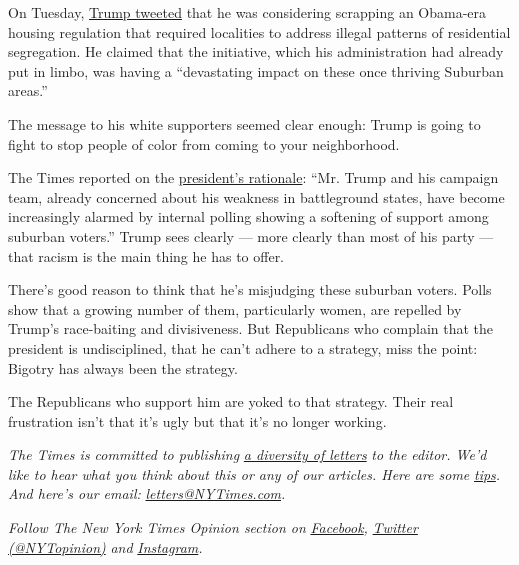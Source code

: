 On Tuesday,
\href{https://twitter.com/realDonaldTrump/status/1278136326647406593?s=20}{Trump
tweeted} that he was considering scrapping an Obama-era housing
regulation that required localities to address illegal patterns of
residential segregation. He claimed that the initiative, which his
administration had already put in limbo, was having a ``devastating
impact on these once thriving Suburban areas.''

The message to his white supporters seemed clear enough: Trump is going
to fight to stop people of color from coming to your neighborhood.

The Times reported on the
\href{https://www.nytimes3xbfgragh.onion/2020/07/01/us/politics/trump-obama-housing-discrimination.html?action=click\&module=Top\%20Stories\&pgtype=Homepage}{president's
rationale}: ``Mr. Trump and his campaign team, already concerned about
his weakness in battleground states, have become increasingly alarmed by
internal polling showing a softening of support among suburban voters.''
Trump sees clearly --- more clearly than most of his party --- that
racism is the main thing he has to offer.

There's good reason to think that he's misjudging these suburban voters.
Polls show that a growing number of them, particularly women, are
repelled by Trump's race-baiting and divisiveness. But Republicans who
complain that the president is undisciplined, that he can't adhere to a
strategy, miss the point: Bigotry has always been the strategy.

The Republicans who support him are yoked to that strategy. Their real
frustration isn't that it's ugly but that it's no longer working.

\emph{The Times is committed to publishing}
\href{https://www.nytimes3xbfgragh.onion/2019/01/31/opinion/letters/letters-to-editor-new-york-times-women.html}{\emph{a
diversity of letters}} \emph{to the editor. We'd like to hear what you
think about this or any of our articles. Here are some}
\href{https://help.nytimes3xbfgragh.onion/hc/en-us/articles/115014925288-How-to-submit-a-letter-to-the-editor}{\emph{tips}}\emph{.
And here's our email:}
\href{mailto:letters@NYTimes.com}{\emph{letters@NYTimes.com}}\emph{.}

\emph{Follow The New York Times Opinion section on}
\href{https://www.facebookcorewwwi.onion/nytopinion}{\emph{Facebook}}\emph{,}
\href{http://twitter.com/NYTOpinion}{\emph{Twitter (@NYTopinion)}}
\emph{and}
\href{https://www.instagram.com/nytopinion/}{\emph{Instagram}}\emph{.}

